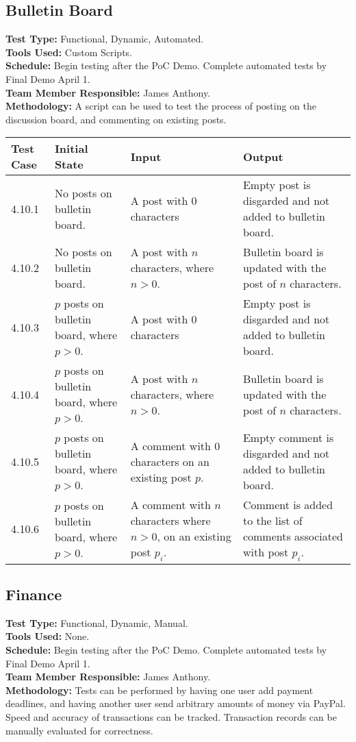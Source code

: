 \documentclass[12pt]{article}
\begin{document}
\subsection{Bulletin Board}
\textbf{Test Type:} Functional, Dynamic, Automated. \\
\textbf{Tools Used:} Custom Scripts. \\
\textbf{Schedule:} Begin testing after the PoC Demo. Complete automated tests by Final Demo April 1. \\
\textbf{Team Member Responsible:} James Anthony. \\
\textbf{Methodology:} A script can be used to test the process of posting on the discussion board, and commenting on existing posts.

\begin{longtable}{|p{2cm}|p{3cm}|p{5cm}|p{5cm}|}
\hline
\textbf{Test Case} & \textbf{Initial State} & \textbf{Input} & \textbf{Output} \\ \hline
4.10.1 & No posts on bulletin board. & A post with 0 characters & Empty post is disgarded and not added to bulletin board.\\
\hline
4.10.2 & No posts on bulletin board. & A post with $n$ characters, where $n > 0$. & Bulletin board is updated with the post of $n$ characters.\\
\hline
4.10.3 & $p$ posts on bulletin board, where $p > 0$. & A post with 0 characters & Empty post is disgarded and not added to bulletin board.\\
\hline
4.10.4 & $p$ posts on bulletin board, where $p > 0$. & A post with $n$ characters, where $n > 0$. & Bulletin board is updated with the post of $n$ characters.\\
\hline
4.10.5 & $p$ posts on bulletin board, where $p > 0$. & A comment with 0 characters on an existing post $p$. & Empty comment is disgarded and not added to bulletin board.\\
\hline
4.10.6 & $p$ posts on bulletin board, where $p > 0$. & A comment with $n$ characters where $n > 0$, on an existing post $p_i$. & Comment is added to the list of comments associated with post $p_i$.\\
\hline
\end{longtable}
  
\subsection{Finance}
\textbf{Test Type:} Functional, Dynamic, Manual. \\
\textbf{Tools Used:} None. \\
\textbf{Schedule:} Begin testing after the PoC Demo. Complete automated tests by Final Demo April 1. \\
\textbf{Team Member Responsible:} James Anthony. \\
\textbf{Methodology:} Tests can be performed by having one user add payment deadlines, and having another user send arbitrary amounts of money via PayPal. Speed and accuracy of transactions can be tracked. Transaction records can be manually evaluated for correctness.
\end{document}
